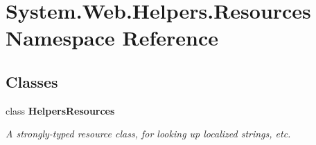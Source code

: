 \hypertarget{namespaceSystem_1_1Web_1_1Helpers_1_1Resources}{}\section{System.\+Web.\+Helpers.\+Resources Namespace Reference}
\label{namespaceSystem_1_1Web_1_1Helpers_1_1Resources}
\subsection*{Classes}
\begin{DoxyCompactItemize}
\item 
class {\bfseries Helpers\+Resources}
\begin{DoxyCompactList}\small\item\em A strongly-\/typed resource class, for looking up localized strings, etc. \end{DoxyCompactList}\end{DoxyCompactItemize}
